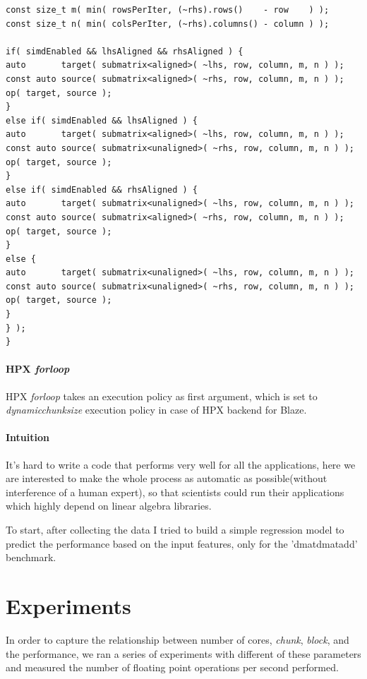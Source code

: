 \begin{lstlisting}[float,floatplacement=H,caption= {New implementation of Assign function for HPX backend in Blaze.}, label={newd_hpx_backend}]
const size_t m( min( rowsPerIter, (~rhs).rows()    - row    ) );
const size_t n( min( colsPerIter, (~rhs).columns() - column ) );

if( simdEnabled && lhsAligned && rhsAligned ) {
auto       target( submatrix<aligned>( ~lhs, row, column, m, n ) );
const auto source( submatrix<aligned>( ~rhs, row, column, m, n ) );
op( target, source );
}
else if( simdEnabled && lhsAligned ) {
auto       target( submatrix<aligned>( ~lhs, row, column, m, n ) );
const auto source( submatrix<unaligned>( ~rhs, row, column, m, n ) );
op( target, source );
}
else if( simdEnabled && rhsAligned ) {
auto       target( submatrix<unaligned>( ~lhs, row, column, m, n ) );
const auto source( submatrix<aligned>( ~rhs, row, column, m, n ) );
op( target, source );
}
else {
auto       target( submatrix<unaligned>( ~lhs, row, column, m, n ) );
const auto source( submatrix<unaligned>( ~rhs, row, column, m, n ) );
op( target, source );
}
} );
}
\end{lstlisting}
\vspace{\baselineskip}	
\paragraph{HPX \textit{for\textunderscore loop}}
HPX \textit{for\textunderscore loop} takes an execution policy as first argument, which is set to \textit{dynamic\textunderscore chunk\textunderscore size} execution policy in case of HPX backend for Blaze.


\vspace{\baselineskip}	
\paragraph{Intuition}
It's hard to write a code that performs very well for all the applications, here we are interested to make the whole process as automatic as possible(without interference of a human expert), so that scientists could run their applications which highly depend on linear algebra libraries. 


To start, after collecting the data I tried to build a simple regression model to predict the performance based on the input features, only for the 'dmatdmatadd' benchmark. 

\vspace{\baselineskip}	
\section{Experiments}
In order to capture the relationship between number of cores, \textit{chunk}, \textit{block}, and the performance, we ran a series of experiments with different of these parameters and measured the number of floating point operations per second performed. 

